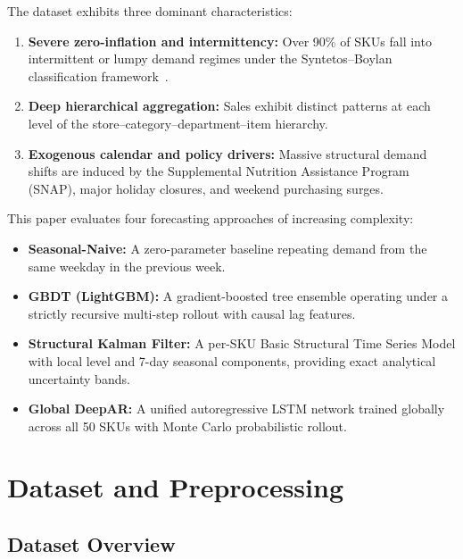 \documentclass[conference]{IEEEtran}
\begin{document}
The dataset exhibits three dominant characteristics:
\begin{enumerate}
    \item \textbf{Severe zero-inflation and intermittency:} Over 90\% of SKUs fall into intermittent or lumpy demand regimes under the Syntetos--Boylan classification framework~\cite{syntetos2005accuracy}.
    \item \textbf{Deep hierarchical aggregation:} Sales exhibit distinct patterns at each level of the store--category--department--item hierarchy.
    \item \textbf{Exogenous calendar and policy drivers:} Massive structural demand shifts are induced by the Supplemental Nutrition Assistance Program (SNAP), major holiday closures, and weekend purchasing surges.
\end{enumerate}

This paper evaluates four forecasting approaches of increasing complexity:
\begin{itemize}
    \item \textbf{Seasonal-Naive:} A zero-parameter baseline repeating demand from the same weekday in the previous week.
    \item \textbf{GBDT (LightGBM):} A gradient-boosted tree ensemble operating under a strictly recursive multi-step rollout with causal lag features.
    \item \textbf{Structural Kalman Filter:} A per-SKU Basic Structural Time Series Model with local level and 7-day seasonal components, providing exact analytical uncertainty bands.
    \item \textbf{Global DeepAR:} A unified autoregressive LSTM network trained globally across all 50 SKUs with Monte Carlo probabilistic rollout.
\end{itemize}

\section{Dataset and Preprocessing}

\subsection{Dataset Overview}
\end{document}
